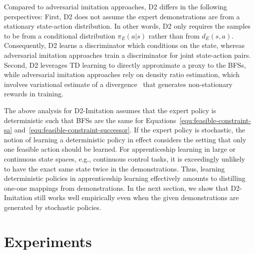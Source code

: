 \documentclass[letterpaper]{article} %
\begin{document}
Compared to adversarial imitation approaches, D2 differs in the following perspectives:
First, D2 does not assume the expert demonstrations are from a stationary state-action distribution. 
In other words, D2 only requires the samples to be from a conditional distribution $\pi_E(a|s)$ 
rather than from $d_E(s, a)$. 
Consequently, D2 learns a discriminator which conditions on the state, 
whereas adversarial imitation approaches train a discriminator for joint state-action pairs. 
Second, D2 leverages TD learning to directly approximate a proxy to the BFSs, 
while adversarial imitation approaches rely on density ratio estimation, which involves variational estimate of a divergence~\cite{nguyen2010estimating} that generates non-stationary rewards in training. 


The above analysis for D2-Imitation assumes that the expert policy is deterministic such that BFSs are the same for Equations~\eqref{equ:feasible-constraint-sa} and~\eqref{equ:feasible-constraint-successor}. 
If the expert policy is stochastic, 
the notion of learning a deterministic policy in effect considers the setting that only one feasible action should be learned. 
For apprenticeship learning in large or continuous state spaces, e.g., continuous control tasks,
it is exceedingly unlikely to have the exact same state twice in the demonstrations.
Thus, learning deterministic policies in apprenticeship learning effectively amounts to distilling one-one mappings from demonstrations. 
In the next section, we show that D2-Imitation still works well empirically even when the given demonstrations are generated by stochastic policies. 


\section{Experiments}
\end{document}

